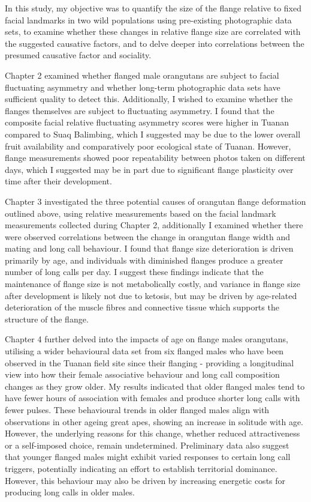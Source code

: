 In this study, my objective was to quantify the size of the flange relative to fixed facial landmarks in two wild populations using pre-existing photographic data sets, to examine whether these changes in relative flange size are correlated with the suggested causative factors, and to delve deeper into correlations between the presumed causative factor and sociality.

Chapter 2 examined whether flanged male orangutans are subject to facial fluctuating asymmetry and whether long-term photographic data sets have sufficient quality to detect this. Additionally, I wished to examine whether the flanges themselves are subject to fluctuating asymmetry. I found that the composite facial relative fluctuating asymmetry scores were higher in Tuanan compared to Suaq Balimbing, which I suggested may be due to the lower overall fruit availability and comparatively poor ecological state of Tuanan. However, flange measurements showed poor repeatability between photos taken on different days, which I suggested may be in part due to significant flange plasticity over time after their development.

Chapter 3 investigated the three potential causes of orangutan flange deformation outlined above, using relative measurements based on the facial landmark measurements collected during Chapter 2, additionally I examined whether there were observed correlations between the change in orangutan flange width and mating and long call behaviour. I found that flange size deterioration is driven primarily by age, and individuals with diminished flanges produce a greater number of long calls per day. I suggest these findings indicate that the maintenance of flange size is not metabolically costly, and variance in flange size after development is likely not due to ketosis, but may be driven by age-related deterioration of the muscle fibres and connective tissue which supports the structure of the flange.

Chapter 4 further delved into the impacts of age on flange males orangutans, utilising a wider behavioural data set from six flanged males who have been observed in the Tuanan field site since their flanging - providing a longitudinal view into how their female associative behaviour and long call composition changes as they grow older. My results indicated that older flanged males tend to have fewer hours of association with females and produce shorter long calls with fewer pulses. These behavioural trends in older flanged males align with observations in other ageing great apes, showing an increase in solitude with age. However, the underlying reasons for this change, whether reduced attractiveness or a self-imposed choice, remain undetermined. Preliminary data also suggest that younger flanged males might exhibit varied responses to certain long call triggers, potentially indicating an effort to establish territorial dominance. However, this behaviour may also be driven by increasing energetic costs for producing long calls in older males.

